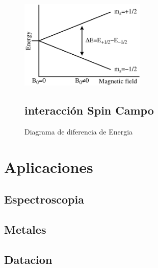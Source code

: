\documentclass[%
amssymb,prb,aps,superscriptaddress]{revtex4}
\begin{document}
    \begin{figure}[H]
        \centering
        \includegraphics[width=6.0cm]{images/EPR_splitting}
        \caption{Diagrama de diferencia de Energia}
        \label{fig:diagramaDiferenciaDeEnergia} \label{sec:momentosAngulares}

        \subsection{interacción Spin Campo}
    \end{figure}

\section{Aplicaciones}
\label{sec:aplicacion1}

\subsection{Espectroscopia}
\label{sec:aplicacion2}

\subsection{Metales}

\subsection{Datacion}
\end{document}
